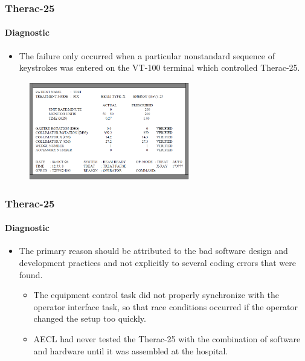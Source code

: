 \begin{frame}
\frametitle{Therac-25}
\framesubtitle{Diagnostic}

\begin{itemize}
	\item The failure only occurred when a particular nonstandard sequence of
	keystrokes was entered on the VT-100 terminal which controlled Therac-25.
\end{itemize}

\begin{figure}
	\centering
	\includegraphics[width=7cm]{aux/examples/therac-25/therac-25-ui}
\end{figure}
\end{frame}


\begin{frame}
\frametitle{Therac-25}
\framesubtitle{Diagnostic}

\begin{itemize}
	\item The primary reason should be attributed to the bad software
	design and development practices and not explicitly to several coding
	errors that were found.
	\begin{itemize}
		\item The equipment control task did not properly synchronize with
		the operator interface task, so that race conditions occurred if
		the operator changed the setup too quickly.

		\item AECL had never tested the Therac-25 with the combination of
		software and hardware until it was assembled at the hospital.
	\end{itemize}
\end{itemize}
\end{frame}



